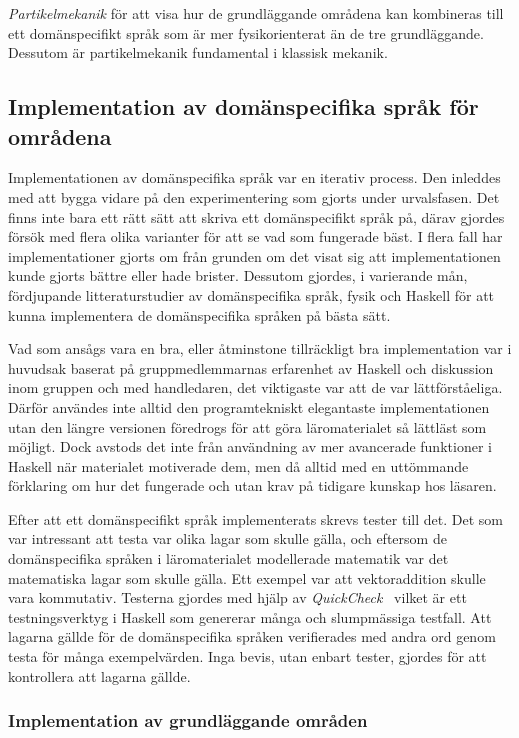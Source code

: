 \textit{Partikelmekanik} för att visa hur de grundläggande områdena kan kombineras till ett domänspecifikt språk som är mer fysikorienterat än de tre grundläggande. Dessutom är partikelmekanik fundamental i klassisk mekanik.

\subsection{Implementation av domänspecifika språk för områdena}

Implementationen av domänspecifika språk var en iterativ process.
Den inleddes med att
bygga vidare på den experimentering som gjorts under urvalsfasen. Det finns inte bara
ett rätt sätt att skriva ett domänspecifikt språk på, därav gjordes försök med
flera olika varianter för att se vad som fungerade bäst.  I flera fall har implementationer gjorts om från grunden om
det visat sig att implementationen kunde gjorts bättre eller
hade brister. Dessutom gjordes, i varierande mån, fördjupande litteraturstudier av domänspecifika
språk, fysik och Haskell för att kunna implementera de domänspecifika språken på bästa sätt.

Vad som ansågs vara en bra, eller åtminstone tillräckligt bra implementation
var i huvudsak baserat på gruppmedlemmarnas erfarenhet av Haskell och diskussion
inom gruppen och med handledaren, det viktigaste var att de var
lättförståeliga. Därför användes inte alltid den programtekniskt elegantaste
implementationen utan den längre versionen föredrogs för att göra
läromaterialet så lättläst som möjligt. Dock avstods det inte från användning av
mer avancerade funktioner i Haskell när materialet motiverade dem, men då alltid
med en uttömmande förklaring om hur det fungerade och utan krav på tidigare
kunskap hos läsaren.

Efter att ett domänspecifikt språk implementerats skrevs tester till det. Det
som var intressant att testa var olika lagar som skulle gälla, och  eftersom de
domänspecifika språken i läromaterialet modellerade matematik var det matematiska lagar
som skulle gälla. Ett exempel var att vektoraddition skulle vara kommutativ.
Testerna gjordes med hjälp av \textit{QuickCheck}~\cite{QC} vilket är ett
testningsverktyg i Haskell som genererar många och slumpmässiga testfall. Att
lagarna gällde för de domänspecifika språken verifierades med andra ord genom
testa för många exempelvärden. Inga bevis, utan enbart tester, gjordes för att kontrollera att lagarna gällde.

\subsubsection*{Implementation av grundläggande områden}
\label{sec:grund_impl}

